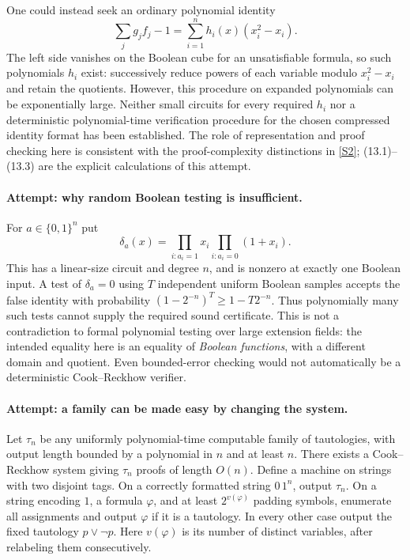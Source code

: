 \documentclass[11pt,a4paper]{article}
\newcommand{\sref}[2]{\hyperlink{source:#1:#2}{[S#2]}}
\begin{document}
One could instead seek an ordinary polynomial identity
\[
 \sum_j g_jf_j-1=\sum_{i=1}^n h_i(x)(x_i^2-x_i). \tag{13.3}
\]
The left side vanishes on the Boolean cube for an unsatisfiable formula,
so such polynomials $h_i$ exist: successively reduce powers of each
variable modulo $x_i^2-x_i$ and retain the quotients. However, this
procedure on expanded polynomials can be exponentially large. Neither
small circuits for every required $h_i$ nor a deterministic polynomial-time
verification procedure for the chosen compressed identity format has
been established. The role of representation and proof checking here
is consistent with the proof-complexity distinctions in \sref{30006679}{2};
(13.1)--(13.3) are the explicit calculations of this attempt.

\paragraph{Attempt: why random Boolean testing is insufficient.}
For $a\in\{0,1\}^n$ put
\[
 \delta_a(x)=\prod_{i:a_i=1}x_i\prod_{i:a_i=0}(1+x_i).
\]
This has a linear-size circuit and degree $n$, and is nonzero at exactly
one Boolean input. A test of $\delta_a=0$ using $T$ independent uniform
Boolean samples accepts the false identity with probability
$(1-2^{-n})^T\geq1-T2^{-n}$. Thus polynomially many such tests cannot
supply the required sound certificate. This is not a contradiction to
formal polynomial testing over large extension fields: the intended
equality here is an equality of \emph{Boolean functions}, with a different
domain and quotient. Even bounded-error checking would not automatically
be a deterministic Cook--Reckhow verifier.

\paragraph{Attempt: a family can be made easy by changing the system.}
Let $\tau_n$ be any uniformly polynomial-time computable family of
tautologies, with output length bounded by a polynomial in $n$ and at
least $n$. There exists a Cook--Reckhow system giving $\tau_n$ proofs of
length $O(n)$. Define a machine on strings with two disjoint tags.
On a correctly formatted string $0\,1^n$, output $\tau_n$.
On a string encoding $1$, a formula $\varphi$, and at least
$2^{v(\varphi)}$ padding symbols, enumerate all assignments and output
$\varphi$ if it is a tautology. In every other case output the fixed
tautology $p\lor\neg p$. Here $v(\varphi)$ is its number of distinct
variables, after relabeling them consecutively.
\end{document}
